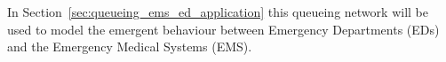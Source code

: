 In Section~\ref{sec:queueing_ems_ed_application} this queueing network will be
used to model the emergent behaviour between
Emergency Departments (EDs) and the Emergency Medical Systems (EMS).











